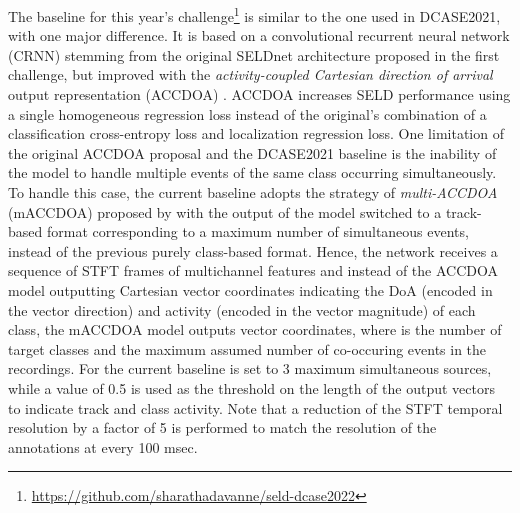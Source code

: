 \documentclass{article}
\begin{document}
\begin{sloppy}
The baseline for this year's challenge\footnote{\url{https://github.com/sharathadavanne/seld-dcase2022}} is similar to the one used in DCASE2021, with one major difference. It is based on a convolutional recurrent neural network (CRNN) stemming from the original SELDnet architecture \cite{adavanne2018sound} proposed in the first challenge, but improved with the \emph{activity-coupled Cartesian direction of arrival} output representation (ACCDOA) \cite{shimada2021accdoa}. ACCDOA increases SELD performance using a single homogeneous regression loss instead of the original's combination of a classification cross-entropy loss and localization regression loss. One limitation of the original ACCDOA proposal and the DCASE2021 baseline is the inability of the model to handle multiple events of the same class occurring simultaneously. To handle this case, the current baseline adopts the strategy of \emph{multi-ACCDOA} (mACCDOA) proposed by \cite{shimada2022multi} with the output of the model switched to a track-based format corresponding to a maximum number of simultaneous events, instead of the previous purely class-based format. Hence, the network receives a sequence of  STFT frames of multichannel features and instead of the ACCDOA model outputting  Cartesian vector coordinates indicating the DoA (encoded in the vector direction) and activity (encoded in the vector magnitude) of each class, the mACCDOA model outputs  vector coordinates, where  is the number of target classes and  the maximum assumed number of co-occuring events in the recordings. For the current baseline  is set to 3 maximum simultaneous sources, while a value of 0.5 is used as the threshold on the length of the output vectors to indicate track and class activity. Note that a reduction of the STFT temporal resolution by a factor of 5 is performed to match the resolution of the annotations at every 100 msec.


\end{sloppy}
\end{document}
